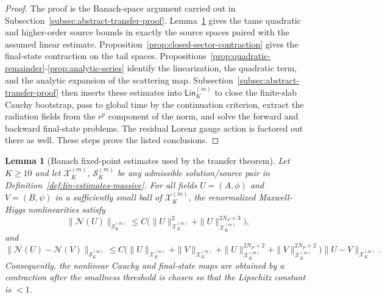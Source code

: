 \documentclass[11pt]{article}
\numberwithin{equation}{section}
\theoremstyle{plain}
\newtheorem{lemma}[theorem]{Lemma}
\theoremstyle{definition}
\theoremstyle{remark}
\newcommand{\Lin}{\mathsf{Lin}}
\begin{document}
\begin{proof}
The proof is the Banach-space argument carried out in Subsection~\ref{subsec:abstract-transfer-proof}.  Lemma~\ref{lem:nonlinear-banach-estimates} gives the tame quadratic and higher-order source bounds in exactly the source spaces paired with the assumed linear estimate.  Proposition~\ref{prop:closed-sector-contraction} gives the final-state contraction on the tail spaces.  Propositions~\ref{prop:quadratic-remainder}-\ref{prop:analytic-series} identify the linearization, the quadratic term, and the analytic expansion of the scattering map.  Subsection~\ref{subsec:abstract-transfer-proof} then inserts these estimates into $\Lin_K^{(m)}$ to close the finite-slab Cauchy bootstrap, pass to global time by the continuation criterion, extract the radiation fields from the $r^p$ component of the norm, and solve the forward and backward final-state problems.  The residual Lorenz gauge action is factored out there as well.  These steps prove the listed conclusions.
\end{proof}


\begin{lemma}[Banach fixed-point estimates used by the transfer theorem]\label{lem:nonlinear-banach-estimates}
Let $K\ge10$ and let $\mathcal X_K^{(m)}$, $\mathcal S_K^{(m)}$ be any admissible solution/source pair in Definition~\ref{def:lin-estimates-massive}. For all fields $U=(A,\phi)$ and $V=(B,\psi)$ in a sufficiently small ball of $\mathcal X_K^{(m)}$, the renormalized Maxwell-Higgs nonlinearities satisfy
\begin{equation}
\|\mathcal N(U)\|_{\mathcal S_K^{(m)}}
\le C\bigl(\|U\|_{\mathcal X_K^{(m)}}^2+\|U\|_{\mathcal X_K^{(m)}}^{2N_P+3}\bigr),
\end{equation}
and
\begin{equation}
\|\mathcal N(U)-\mathcal N(V)\|_{\mathcal S_K^{(m)}}
\le C\bigl(\|U\|_{\mathcal X_K^{(m)}}+\|V\|_{\mathcal X_K^{(m)}}
+\|U\|_{\mathcal X_K^{(m)}}^{2N_P+2}+\|V\|_{\mathcal X_K^{(m)}}^{2N_P+2}\bigr)
\|U-V\|_{\mathcal X_K^{(m)}}.
\end{equation}
Consequently, the nonlinear Cauchy and final-state maps are obtained by a contraction after the smallness threshold is chosen so that the Lipschitz constant is $<1$.
\end{lemma}
\end{document}
